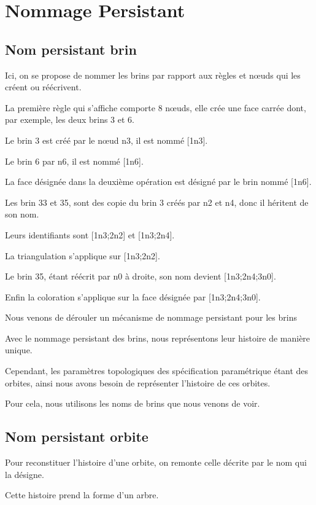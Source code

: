 \documentclass[11pt]{article}
\begin{document}
\section{Nommage Persistant}
\label{sec:org84648da}

\subsection{Nom persistant brin}
\label{sec:org53f1b92}

Ici, on se propose de nommer les brins par rapport aux règles et nœuds qui les
créent ou réécrivent.

La première règle qui s'affiche comporte 8 nœuds, elle crée une face carrée
dont, par exemple, les deux brins 3 et 6.

Le brin 3 est créé par le nœud n3, il est nommé [1n3].

Le brin 6 par n6, il est nommé [1n6].

La face désignée dans la deuxième opération est désigné par le brin nommé [1n6].

Les brin 33 et 35, sont des copie du brin 3 créés par n2 et n4, donc il héritent
de son nom.

Leurs identifiants sont [1n3;2n2] et [1n3;2n4].

La triangulation s'applique sur [1n3;2n2].

Le brin 35, étant réécrit par n0 à droite, son nom devient [1n3;2n4;3n0].

Enfin la coloration s'applique sur la face désignée par [1n3;2n4;3n0].

Nous venons de dérouler un mécanisme de nommage persistant pour les brins

Avec le nommage persistant des brins, nous représentons leur histoire de manière
unique.

Cependant, les paramètres topologiques des spécification paramétrique étant des
orbites, ainsi nous avons besoin de représenter l'histoire de ces orbites.

Pour cela, nous utilisons les noms de brins que nous venons de voir.
\subsection{Nom persistant orbite}
\label{sec:orgf5219a2}

Pour reconstituer l'histoire d'une orbite, on remonte celle décrite par
le nom qui la désigne.

Cette histoire prend la forme d'un arbre.
\end{document}
